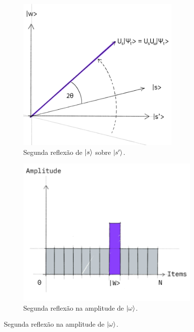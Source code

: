 \begin{figure}[ht!]
    \centering
    \captionsetup{justification=centering}
    \caption{Segunda reflexão dos estados $\ket{s}$ e $\ket{\omega}$, respectivamente.}
    \label{fig:transformacaoCompleta}  %

    \begin{subfigure}[b]{0.4\textwidth}
        \centering
        \includegraphics[width=\textwidth]{Imagens/reflexaoEstado.png}
        \caption{Segunda reflexão de $\ket{s}$ sobre $\ket{s'}$.}
        \label{subfig:reflexaoEstado}
    \end{subfigure}
    \hfill
    \begin{subfigure}[b]{0.48\textwidth}
        \centering
        \includegraphics[width=\textwidth]{Imagens/reflexaoAmplitude.png}
        \caption{Segunda reflexão na amplitude de $\ket{\omega}$.}
        \label{subfig:reflexaoAmplitude}
    \end{subfigure}


\end{figure}
